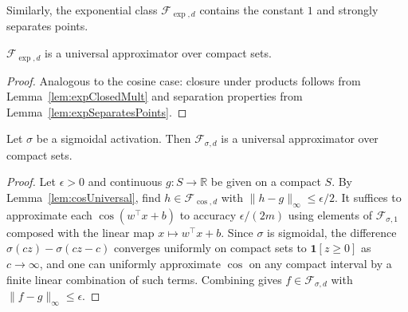 \begin{lemma}\label{lem:expSeparatesPoints}
Similarly, the exponential class $\mathcal{F}_{\exp,d}$ contains the constant $1$ and strongly separates points.
\end{lemma}

\begin{lemma}\label{lem:expUniversal}
$\mathcal{F}_{\exp,d}$ is a universal approximator over compact sets.
\end{lemma}

\begin{proof}
  Analogous to the cosine case: closure under products follows from Lemma~\ref{lem:expClosedMult} and separation properties from Lemma~\ref{lem:expSeparatesPoints}.
\end{proof}

\begin{theorem}\label{thm:universalSigmoidal}
Let $\sigma$ be a sigmoidal activation.
Then $\mathcal{F}_{\sigma,d}$ is a universal approximator over compact sets.
\end{theorem}

\begin{proof}
  Let $\epsilon > 0$ and continuous $g : S \to \mathbb{R}$ be given on a compact $S$.
  By Lemma~\ref{lem:cosUniversal}, find $h \in \mathcal{F}_{\cos,d}$ with $\|h - g\|_\infty \le \epsilon/2$.
  It suffices to approximate each $\cos(w^\top x + b)$ to accuracy $\epsilon/(2m)$ using elements of $\mathcal{F}_{\sigma,1}$ composed with the linear map $x \mapsto w^\top x + b$.
  Since $\sigma$ is sigmoidal, the difference $\sigma(cz) - \sigma(cz - c)$ converges uniformly on compact sets to $\mathbf{1}[z \ge 0]$ as $c \to \infty$, and one can uniformly approximate $\cos$ on any compact interval by a finite linear combination of such terms.
  Combining gives $f \in \mathcal{F}_{\sigma,d}$ with $\|f - g\|_\infty \le \epsilon$.
\end{proof}

